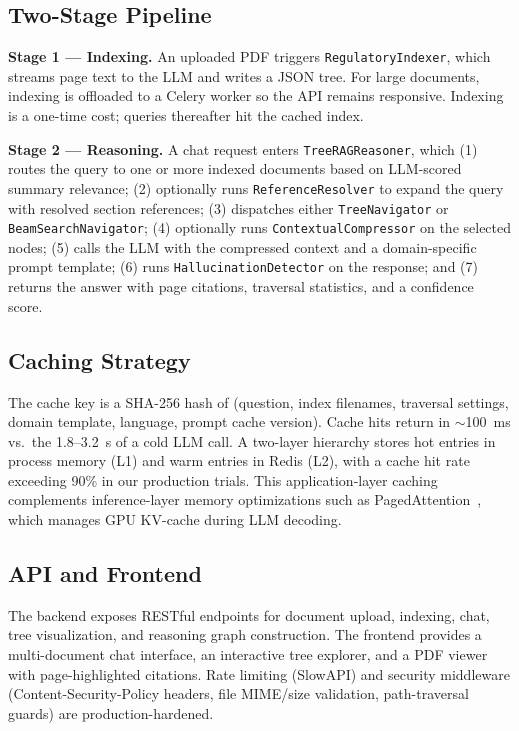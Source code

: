 \documentclass[sigconf,review,anonymous]{acmart}
\begin{document}
\subsection{Two-Stage Pipeline}
\textbf{Stage 1 --- Indexing.} An uploaded PDF triggers
\texttt{RegulatoryIndexer}, which streams page text to the LLM and writes a JSON
tree. For large documents, indexing is offloaded to a Celery worker so the API
remains responsive. Indexing is a one-time cost; queries thereafter hit the
cached index.

\textbf{Stage 2 --- Reasoning.} A chat request enters \texttt{TreeRAGReasoner},
which (1) routes the query to one or more indexed documents based on LLM-scored
summary relevance; (2) optionally runs \texttt{ReferenceResolver} to expand the
query with resolved section references; (3) dispatches either
\texttt{TreeNavigator} or \texttt{BeamSearchNavigator}; (4) optionally runs
\texttt{ContextualCompressor} on the selected nodes; (5) calls the LLM with the
compressed context and a domain-specific prompt template; (6) runs
\texttt{HallucinationDetector} on the response; and (7) returns the answer with
page citations, traversal statistics, and a confidence score.

\subsection{Caching Strategy}
The cache key is a SHA-256 hash of (question, index filenames, traversal
settings, domain template, language, prompt cache version). Cache hits return in
$\sim$100~ms vs.\ the 1.8--3.2~s of a cold LLM call. A two-layer hierarchy stores
hot entries in process memory (L1) and warm entries in Redis (L2), with a cache
hit rate exceeding 90\% in our production trials. This application-layer caching
complements inference-layer memory optimizations such as
PagedAttention~\cite{kwon2023paged}, which manages GPU KV-cache during LLM
decoding.

\subsection{API and Frontend}
The backend exposes RESTful endpoints for document upload, indexing, chat, tree
visualization, and reasoning graph construction. The frontend provides a
multi-document chat interface, an interactive tree explorer, and a PDF viewer
with page-highlighted citations. Rate limiting (SlowAPI) and security middleware
(Content-Security-Policy headers, file MIME/size validation, path-traversal
guards) are production-hardened.
\end{document}
